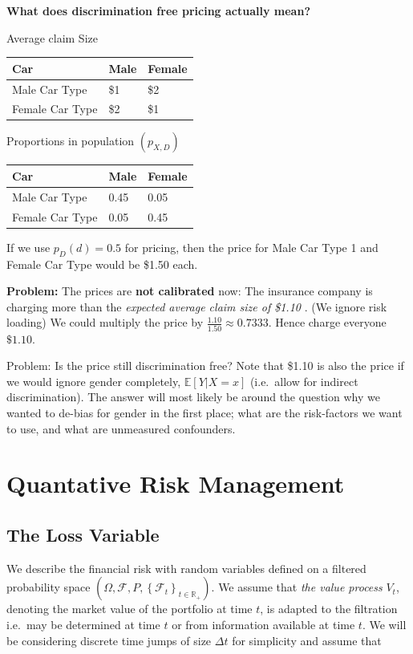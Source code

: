 \documentclass[a4paper,12pt,openany]{book}
\begin{document}
\textbf{What does discrimination free pricing actually mean?}

Average claim Size

\begin{longtable}[]{@{}lll@{}}
\toprule()
Car & Male & Female \\
\midrule()
\endhead
Male Car Type & \$1 & \$2 \\
Female Car Type & \$2 & \$1 \\
\bottomrule()
\end{longtable}

Proportions in population \((p_{X,D})\)

\begin{longtable}[]{@{}lll@{}}
\toprule()
Car & Male & Female \\
\midrule()
\endhead
Male Car Type & 0.45 & 0.05 \\
Female Car Type & 0.05 & 0.45 \\
\bottomrule()
\end{longtable}

If we use \(p_D(d) = 0.5\) for pricing, then the price for Male Car Type 1 and Female Car Type would be \$1.50 each.

\textbf{Problem:} The prices are \textbf{not calibrated} now: The insurance company is charging more than the \emph{expected average claim size of \$1.10 }. (We ignore risk loading) We could multiply the price by \(\frac{1.10}{1.50}\approx 0.7333\). Hence charge everyone \(\$1.10\).

Problem: Is the price still discrimination free? Note that \$1.10 is also the price if we would ignore gender completely, \(\mathbb E[Y|X=x]\) (i.e.~allow for indirect discrimination). The answer will most likely be around the question why we wanted to de-bias for gender in the first place; what are the risk-factors we want to use, and what are unmeasured confounders.

\hypertarget{quantative-risk-management}{%
\chapter{Quantative Risk Management}\label{quantative-risk-management}}

\hypertarget{the-loss-variable}{%
\section{The Loss Variable}\label{the-loss-variable}}

We describe the financial risk with random variables defined on a filtered probability space \(\left(\Omega,\mathcal{F},P,\left\{\mathcal{F}_t\right\}_{t\in \mathbb{R}_+}\right)\). We assume that \emph{the value process} \(V_t\), denoting the market value of the portfolio at time \(t\), is adapted to the filtration i.e.~may be determined at time \(t\) or from information available at time \(t\). We will be considering discrete time jumps of size \(\Delta t\) for simplicity and assume that
\end{document}
